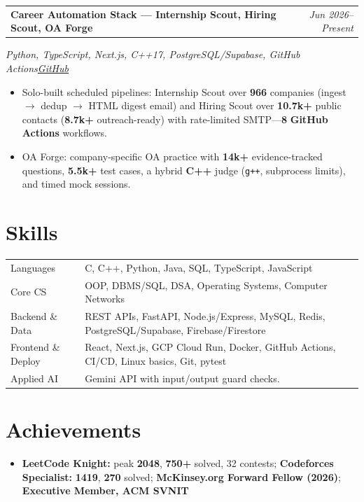 \documentclass[a4paper,10pt]{article}
\makeatletter
\newcommand{\proj}[4]{%
  \vspace{1.6mm}
  \noindent\begin{tabularx}{\textwidth}{@{}L R@{}}
    \textbf{#1} & \textit{\small #2} \\
  \end{tabularx}\par
  {\small\textit{#3}\hfill\textit{#4}}\par
  \vspace{0.5mm}%
}
\makeatother
\begin{document}
\proj{Career Automation Stack --- Internship Scout, Hiring Scout, OA Forge}{Jun 2026--Present}
{Python, TypeScript, Next.js, C++17, PostgreSQL/Supabase, GitHub Actions}
{\href{https://github.com/Ojas-Srivastava05/automation-workflows}{GitHub}}
\begin{itemize}
  \item Solo-built scheduled pipelines: Internship Scout over \textbf{966} companies (ingest $\to$ dedup $\to$ HTML digest email) and Hiring Scout over \textbf{10.7k+} public contacts (\textbf{8.7k+} outreach-ready) with rate-limited SMTP---\textbf{8} \textbf{GitHub Actions} workflows.
  \item OA Forge: company-specific OA practice with \textbf{14k+} evidence-tracked questions, \textbf{5.5k+} test cases, a hybrid \textbf{C++} judge (\texttt{g++}, subprocess limits), and timed mock sessions.
\end{itemize}

\section{Skills}
\noindent\small
{\renewcommand{\arraystretch}{1.28}%
\begin{tabularx}{\textwidth}{@{}K >{\raggedright\arraybackslash}X@{}}
Languages & C, C++, Python, Java, SQL, TypeScript, JavaScript \\
Core CS & OOP, DBMS/SQL, DSA, Operating Systems, Computer Networks \\
Backend \& Data & REST APIs, FastAPI, Node.js/Express, MySQL, Redis, PostgreSQL/Supabase, Firebase/Firestore \\
Frontend \& Deploy & React, Next.js, GCP Cloud Run, Docker, GitHub Actions, CI/CD, Linux basics, Git, pytest \\
Applied AI & Gemini API with input/output guard checks. \\
\end{tabularx}}

\section{Achievements}
\begin{itemize}
  \item \textbf{LeetCode Knight:} peak \textbf{2048}, \textbf{750+} solved, 32 contests; \textbf{Codeforces Specialist:} \textbf{1419}, \textbf{270} solved; \textbf{McKinsey.org Forward Fellow (2026)}; \textbf{Executive Member, ACM SVNIT}
\end{itemize}
\end{document}
